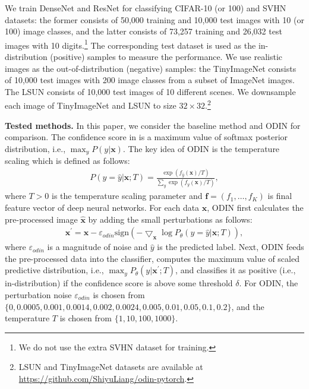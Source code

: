 \documentclass{article}
\begin{document}
We train DenseNet and ResNet for classifying CIFAR-10 (or 100) and SVHN datasets: the former consists of 50,000 training and 10,000 test
images with 10 (or 100) image classes, and the latter consists of 73,257 training and 26,032 test images with 10 digits.\footnote{We do not use the extra SVHN dataset for training.} 
The corresponding test dataset is used as the in-distribution (positive) samples to measure the performance. 
We use realistic images as the out-of-distribution (negative) samples: the TinyImageNet consists of 10,000 test images with 200 image classes from a subset of ImageNet images. The LSUN consists of 10,000 test images of 10 different scenes. We downsample each image of TinyImageNet and LSUN to size $32\times32$.\footnote{LSUN and TinyImageNet datasets are available at \url{https://github.com/ShiyuLiang/odin-pytorch}.}

{\bf Tested methods.}
In this paper, 
we consider the baseline method \citep{hendrycks2016baseline} and ODIN \citep{liang2017principled} for comparison.
The confidence score in \citet{hendrycks2016baseline} is a maximum value of softmax posterior distribution, i.e., $\max_y P(y|\mathbf{x})$.
The key idea of ODIN is the temperature scaling which is defined as follows:
\begin{align*}
P (y={\widehat y}|\mathbf{x};T)
= \frac{\exp \left( f_{{\widehat y}} (\mathbf{x}) / T \right)}{\sum_{y} \exp \left( f_{ y} (\mathbf{x}) / T \right)},
\end{align*}
where $T>0$ is the temperature scaling parameter and $\mathbf{f} = (f_1,\ldots, f_K)$ is final feature vector of deep neural networks.
For each data $\mathbf{x}$, ODIN first calculates the pre-processed image $\mathbf{\widehat x}$ by adding the small perturbations as follows:
\begin{align*}
\mathbf{x}^\prime = \mathbf{x} - \varepsilon_{odin} \text{sign} \left( -\bigtriangledown_{\mathbf{x}} \log P_{\theta} (y={\widehat y}|\mathbf{x};T) \right),
\end{align*}
where $\varepsilon_{odin}$ is a magnitude of noise and $\widehat y$ is the predicted label.
Next, ODIN feeds the pre-processed data into the classifier, computes the maximum value of scaled predictive distribution, i.e., $\max_y P_{\theta} (y|\mathbf{x}^\prime; T)$, and classifies it as positive (i.e., in-distribution) if the confidence score is above some threshold $\delta$.
For ODIN, the perturbation noise $\varepsilon_{odin}$ is chosen from $\{0, 0.0005, 0.001, 0.0014, 0.002, 0.0024, 0.005, 0.01, 0.05, 0.1, 0.2 \}$, and the temperature $T$ is chosen from $\{1,10,100,1000\}$.
\end{document}
